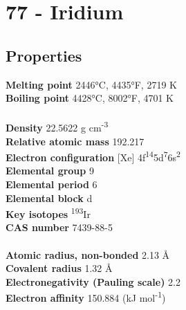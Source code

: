\section{77 - Iridium}
\label{sec:elem-iridium}
\subsection{Properties}
\textbf{Melting point} 2446°C, 4435°F, 2719 K\\
\textbf{Boiling point} 4428°C, 8002°F, 4701 K\\
\\
\textbf{Density} 22.5622 g cm\textsuperscript{-3}\\
\textbf{Relative atomic mass} 192.217\\
\textbf{Electron configuration} [Xe] 4f\textsuperscript{14}5d\textsuperscript{7}6s\textsuperscript{2}\\
\textbf{Elemental group} 9\\
\textbf{Elemental period} 6\\
\textbf{Elemental block} d\\
\textbf{Key isotopes} \textsuperscript{193}Ir\\
\textbf{CAS number} 7439-88-5\\
\\
\textbf{Atomic radius, non-bonded} 2.13 Å\\
\textbf{Covalent radius} 1.32 Å\\
\textbf{Electronegativity (Pauling scale)} 2.2\\
\textbf{Electron affinity} 150.884 (kJ mol\textsuperscript{-1})\\